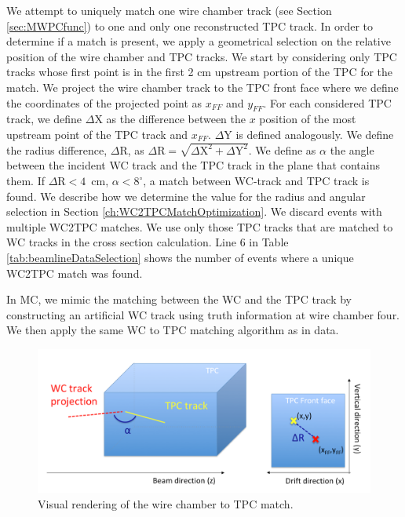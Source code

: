 We attempt to uniquely match one wire chamber track (see Section \ref{sec:MWPCfunc}) to one and only one reconstructed TPC track. 
In order to determine if a match is present, we apply a geometrical selection on the relative position of the wire chamber and TPC tracks. 
We start by considering only TPC tracks whose first point is in the first 2 cm upstream portion of the TPC for the match.  We project the wire chamber track to the TPC front face where we define the coordinates of the projected point as  $x_{FF}$ and $y_{FF}$.  For each considered TPC track, we define $\Delta$X as the difference between the $x$ position of the most upstream point of the TPC track and $x_{FF}$.  $\Delta$Y is defined analogously. We define the radius difference, $\Delta$R, as $ \Delta \text{R} =  \sqrt{ \Delta \text{X}^2 +  \Delta \text{Y}^2}  $. We define  as $\alpha$ the angle between the incident WC track and the TPC track in the plane that contains them.  If  $\Delta \text{R} < 4 $~cm, $\alpha < 8^\circ $,  a match between WC-track and TPC track is found. We describe  how we determine the value for the radius and angular selection in Section \ref{ch:WC2TPCMatchOptimization}.
We discard events with multiple WC2TPC matches. We use only those TPC tracks that are matched to WC tracks in the cross section calculation. Line 6 in Table \ref{tab:beamlineDataSelection} shows the number of events where a unique WC2TPC match was found.

In MC, we mimic the matching between the WC and the TPC track by constructing an artificial WC track using truth information at wire chamber four. We then apply the same WC to TPC matching algorithm as in data. 


\begin{figure}
  \centering  
\includegraphics[width=\textwidth]{Chapter-4/Images/WC2TPCMatchTracks.png}
\caption{Visual rendering of the wire chamber to TPC match.}
\label{fig:showerFilt}
\end{figure}

